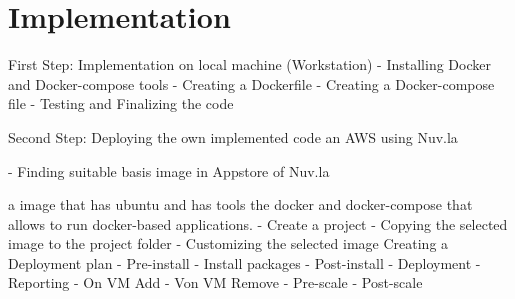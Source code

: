 \chapter{Implementation}
\label{cha:implementation}

First Step: Implementation on local machine (Workstation)
-	Installing Docker and Docker-compose tools
-	Creating a Dockerfile
-	Creating a Docker-compose file
-	Testing and Finalizing the code 

Second Step: Deploying the own implemented code an AWS using Nuv.la

-	Finding suitable basis image in Appstore of Nuv.la



a image that has ubuntu and has tools the docker and docker-compose that allows to run docker-based applications. 
-	Create a project
-	Copying the selected image to the project folder
-	Customizing the selected image 
Creating a Deployment plan
-	Pre-install
-	Install packages
-	Post-install
-	Deployment
-	Reporting
-	On VM Add
-	Von VM Remove
-	Pre-scale
-	Post-scale
